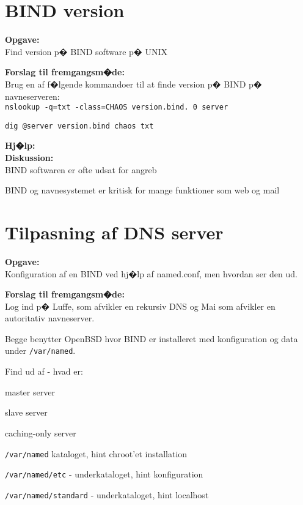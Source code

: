 \documentclass[a4paper,11pt,notitlepage]{oevelser}
\begin{document}
\chapter{BIND version}
\label{ex:bind-version}

{\bfseries Opgave:} \\
Find version p� BIND software p� UNIX

{\bfseries Forslag til fremgangsm�de:}\\
Brug en af f�lgende kommandoer til at finde version p� BIND p�
navneserveren:\\

\verb+nslookup -q=txt -class=CHAOS version.bind. 0 server+

\verb+dig @server version.bind chaos txt+


{\bfseries Hj�lp:} \\

{\bfseries Diskussion:} \\
BIND softwaren er ofte udsat for angreb

BIND og navnesystemet er kritisk for mange funktioner som web og mail

\chapter{Tilpasning af DNS server}
\label{ex:bind-config}
{\bfseries Opgave:}\\
Konfiguration af en BIND ved hj�lp af named.conf, men hvordan ser den ud.

{\bfseries Forslag til fremgangsm�de:}\\

Log ind p� Luffe, som afvikler en rekursiv DNS og Mai som afvikler en autoritativ navneserver.

Begge benytter OpenBSD hvor BIND er installeret med konfiguration og data under \verb+/var/named+.

\begin{list1}
\item Find ud af - hvad er:
\begin{list2}
\item master server
\item slave server
\item caching-only server
\end{list2}
\item \verb+/var/named+ kataloget, hint chroot'et installation
\item \verb+/var/named/etc+ - underkataloget, hint konfiguration
\item \verb+/var/named/standard+ - underkataloget, hint localhost
\end{list1}
\end{document}

